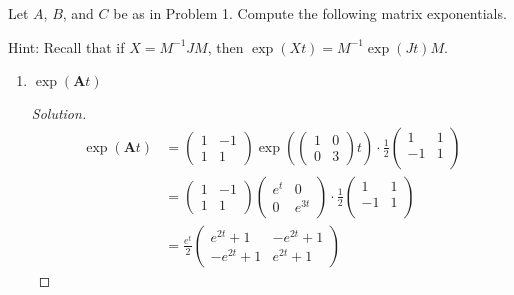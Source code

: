 \documentclass{article}
\newcommand{\paren}[1]{\left( #1 \right)}
\newenvironment{problem}[2][Problem]{\begin{trivlist}
\item[\hskip \labelsep {\bfseries #1}\hskip \labelsep {\bfseries #2.}]}{\end{trivlist}}
\newenvironment{solution}{\begin{proof}[Solution]}{\end{proof}}
\begin{document}


\begin{problem}{2}
    Let $A$, $B$, and $C$ be as in Problem 1. Compute the following matrix exponentials.

    Hint: Recall that if $X = M^{-1}JM$, then $\exp(Xt) = M^{-1} \exp(Jt) M$.
\end{problem}

\begin{enumerate}
    \item[I] $\exp(\mathbf At)$
    \begin{solution}
    \begin{align*}
        \exp(\mathbf At) &= \begin{pmatrix}
            1 & -1 \\
            1 & 1
        \end{pmatrix} \exp \paren{\begin{pmatrix}
            1 & 0 \\
            0 & 3
        \end{pmatrix}t}
        \cdot \frac{1}{2} \begin{pmatrix}
            1 & 1 \\
            -1 & 1 \\
        \end{pmatrix} \\
        &= \begin{pmatrix}
            1 & -1 \\
            1 & 1
        \end{pmatrix} \begin{pmatrix}
            e^t & 0 \\
            0 & e^{3t}
        \end{pmatrix}
        \cdot \frac{1}{2} \begin{pmatrix}
            1 & 1 \\
            -1 & 1 \\
        \end{pmatrix} \\
        &= \frac{e^t}{2} \begin{pmatrix}
            e^{2t}+1 & -e^{2t} + 1 \\
            -e^{2t} + 1 & e^{2t}+1
        \end{pmatrix}
    \end{align*}
    \end{solution}

\vspace*{100pt}


\end{enumerate}
\end{document}
